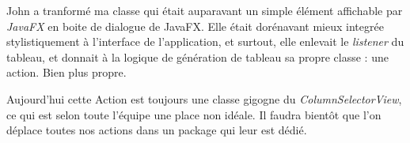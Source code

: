 John a tranformé ma classe qui était auparavant un simple élément affichable par \textit{JavaFX} en boite de dialogue de JavaFX. Elle était dorénavant mieux integrée stylistiquement à l'interface de l'application, et surtout, elle enlevait le \textit{listener} du tableau, et donnait à la logique de génération de tableau sa propre classe : une action. Bien plus propre.

Aujourd'hui cette Action est toujours une classe gigogne du \textit{ColumnSelectorView}, ce qui est selon toute l'équipe une place non idéale. Il faudra bientôt que l'on déplace toutes nos actions dans un package qui leur est dédié.
